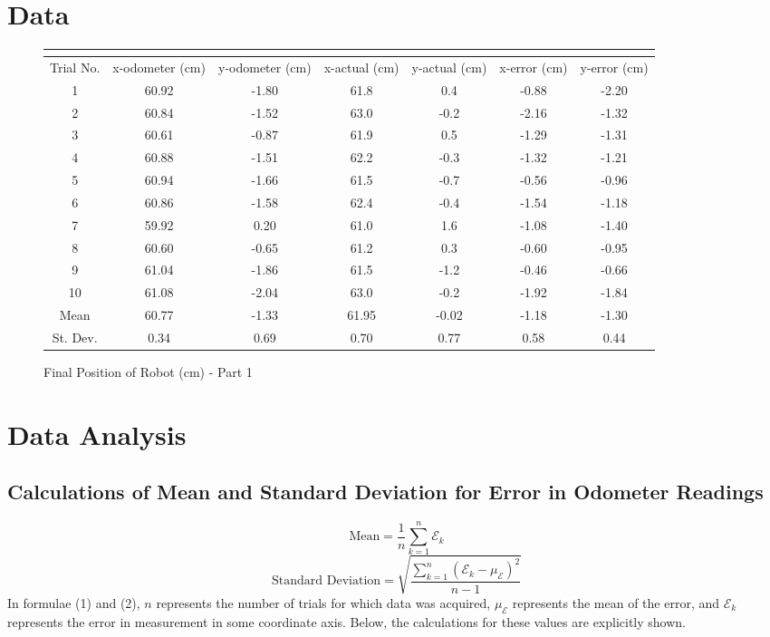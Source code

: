 \documentclass[11pt]{article}
\begin{document}
\section{Data}
\begin{figure}[h!t]
\begin{center}
\caption{Final Position of Robot (cm) - Part 1}
\begin{tabular}{| c | c | c | c | c | c | c |}
\multicolumn{4}{c}{} \\ \hline
Trial No. & x-odometer (cm) & y-odometer (cm) & x-actual (cm) & y-actual (cm) & x-error (cm)  &
y-error (cm) \\ \hline
1 & 60.92 & -1.80 & 61.8 & 0.4 & -0.88 & -2.20 \\ \hline
2 & 60.84 & -1.52 & 63.0 & -0.2 & -2.16 & -1.32 \\ \hline
3 & 60.61 & -0.87 & 61.9 & 0.5 & -1.29 & -1.31 \\ \hline
4 & 60.88 & -1.51 & 62.2 & -0.3 & -1.32 & -1.21 \\ \hline
5 & 60.94 & -1.66 & 61.5 & -0.7 & -0.56 & -0.96 \\ \hline
6 & 60.86 & -1.58 & 62.4 & -0.4 & -1.54 & -1.18 \\ \hline
7 & 59.92 & 0.20 & 61.0 & 1.6 & -1.08 & -1.40 \\ \hline
8 & 60.60 & -0.65 & 61.2 & 0.3 & -0.60 & -0.95 \\ \hline
9 & 61.04 & -1.86 & 61.5 & -1.2 & -0.46 & -0.66 \\ \hline
10 & 61.08 & -2.04 & 63.0 & -0.2 & -1.92 & -1.84 \\ \hline
Mean & 60.77 & -1.33 & 61.95 & -0.02 & -1.18 & -1.30 \\ \hline
St. Dev. & 0.34 & 0.69 & 0.70 & 0.77 & 0.58 & 0.44 \\ \hline
\end{tabular}
\end{center}
\end{figure}
\section{Data Analysis}
\subsection{Calculations of Mean and Standard Deviation for Error in Odometer Readings}
\begin{equation}
	\mbox{Mean} = \frac{1}{n} \sum_{k=1}^{n}\mathcal{E}_k
\end{equation}
\begin{equation}
	\mbox{Standard Deviation} = \sqrt{\frac{\sum_{k=1}^{n}(\mathcal{E}_k-\mu_{\mathcal{E}})^2}{n-1}}
\end{equation}
In formulae (1) and (2), $n$ represents the number of trials for which data was acquired,
$\mu_{\mathcal{E}}$ represents the mean of the error, and
$\mathcal{E}_k$ represents the error in measurement in some coordinate axis. Below, the calculations
for these values are explicitly shown.
\end{document}
